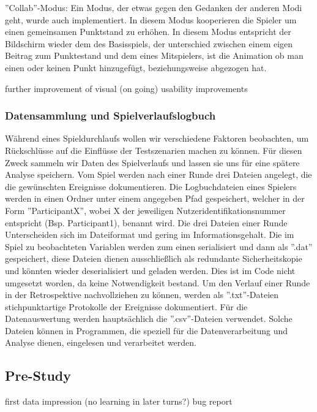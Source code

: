 \item''Collab''-Modus:\newline
Ein Modus, der etwas gegen den Gedanken der anderen Modi geht, wurde auch implementiert.  In diesem Modus kooperieren die Spieler um einen gemeinsamen Punktstand zu erhöhen. In diesem Modus entspricht der Bildschirm wieder dem des Basisspiels, der unterschied zwischen einem eigen Beitrag zum Punktestand und dem eines Mitspielers, ist die Animation ob man einen oder keinen Punkt hinzugefügt, beziehungsweise abgezogen hat.

further improvement of visual (on going)\newline
usability improvements
\subsubsection{Datensammlung und Spielverlaufslogbuch}
Während eines Spieldurchlaufs wollen wir verschiedene Faktoren beobachten, um Rückschlüsse auf die Einflüsse der Testszenarien  machen zu können. Für diesen Zweck sammeln wir  Daten des Spielverlaufs und lassen sie uns für eine spätere Analyse speichern. Vom Spiel werden nach einer Runde drei Dateien angelegt, die die gewünschten Ereignisse dokumentieren. Die Logbuchdateien eines Spielers werden in einen Ordner unter einem angegeben Pfad gespeichert, welcher in der Form ''ParticipantX'', wobei X der jeweiligen Nutzeridentifikationsnummer entspricht (Bsp. Participant1), benannt wird. Die drei Dateien einer Runde Unterscheiden sich im Dateiformat und gering  im Informationsgehalt. Die im Spiel zu beobachteten Variablen werden zum einen serialisiert und dann als ''.dat'' gespeichert, diese Dateien dienen ausschließlich als redundante Sicherheitskopie und könnten wieder deserialisiert und  geladen werden. Dies ist im Code nicht umgesetzt worden, da keine Notwendigkeit bestand.\newline
Um den Verlauf einer Runde in der Retrospektive nachvollziehen zu können, werden als ''.txt''-Dateien stichpunktartige Protokolle der Ereignisse dokumentiert.\newline
Für die Datenauswertung  werden hauptsächlich die ''.csv''-Dateien verwendet. Solche Dateien können in Programmen, die speziell für die Datenverarbeitung  und Analyse dienen, eingelesen und verarbeitet werden.

\subsection{Pre-Study}
first data impression (no learning in later turns?)
bug report
